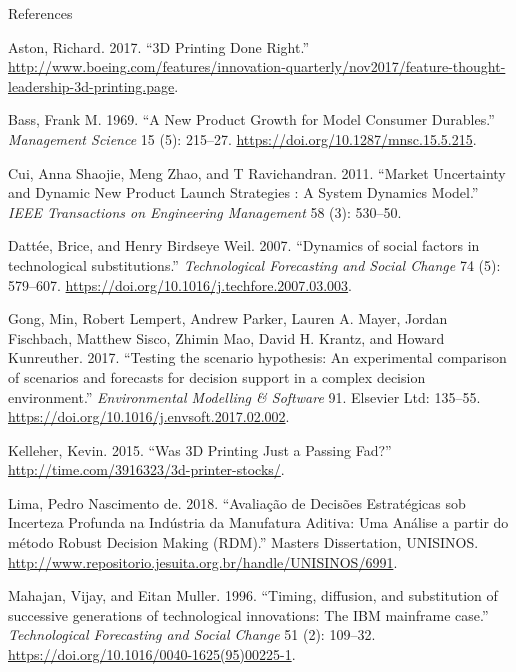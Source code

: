 \documentclass[12pt,ignorenonframetext,]{beamer}
\begin{document}
\begin{frame}{References}
\protect\hypertarget{references}{}

\hypertarget{refs}{}
\leavevmode\hypertarget{ref-Aston2017}{}%
Aston, Richard. 2017. ``3D Printing Done Right.''
\url{http://www.boeing.com/features/innovation-quarterly/nov2017/feature-thought-leadership-3d-printing.page}.

\leavevmode\hypertarget{ref-Bass1969}{}%
Bass, Frank M. 1969. ``A New Product Growth for Model Consumer
Durables.'' \emph{Management Science} 15 (5): 215--27.
\url{https://doi.org/10.1287/mnsc.15.5.215}.

\leavevmode\hypertarget{ref-Cui2011}{}%
Cui, Anna Shaojie, Meng Zhao, and T Ravichandran. 2011. ``Market
Uncertainty and Dynamic New Product Launch Strategies : A System
Dynamics Model.'' \emph{IEEE Transactions on Engineering Management} 58
(3): 530--50.

\leavevmode\hypertarget{ref-Dattee2007}{}%
Dattée, Brice, and Henry Birdseye Weil. 2007. ``Dynamics of social
factors in technological substitutions.'' \emph{Technological
Forecasting and Social Change} 74 (5): 579--607.
\url{https://doi.org/10.1016/j.techfore.2007.03.003}.

\leavevmode\hypertarget{ref-Gong2017}{}%
Gong, Min, Robert Lempert, Andrew Parker, Lauren A. Mayer, Jordan
Fischbach, Matthew Sisco, Zhimin Mao, David H. Krantz, and Howard
Kunreuther. 2017. ``Testing the scenario hypothesis: An experimental
comparison of scenarios and forecasts for decision support in a complex
decision environment.'' \emph{Environmental Modelling \& Software} 91.
Elsevier Ltd: 135--55.
\url{https://doi.org/10.1016/j.envsoft.2017.02.002}.

\leavevmode\hypertarget{ref-Kelleher2015}{}%
Kelleher, Kevin. 2015. ``Was 3D Printing Just a Passing Fad?''
\url{http://time.com/3916323/3d-printer-stocks/}.

\leavevmode\hypertarget{ref-Lima2018}{}%
Lima, Pedro Nascimento de. 2018. ``Avaliação de Decisões Estratégicas
sob Incerteza Profunda na Indústria da Manufatura Aditiva: Uma Análise a
partir do método Robust Decision Making (RDM).'' Masters Dissertation,
UNISINOS.
\url{http://www.repositorio.jesuita.org.br/handle/UNISINOS/6991}.

\leavevmode\hypertarget{ref-Mahajan1996}{}%
Mahajan, Vijay, and Eitan Muller. 1996. ``Timing, diffusion, and
substitution of successive generations of technological innovations: The
IBM mainframe case.'' \emph{Technological Forecasting and Social Change}
51 (2): 109--32. \url{https://doi.org/10.1016/0040-1625(95)00225-1}.


\end{frame}
\end{document}
